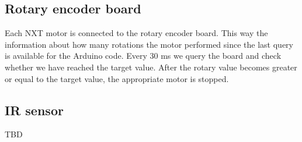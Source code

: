 \documentclass[12pt]{article}
\begin{document}
\subsection{Rotary encoder board}

Each NXT motor is connected to the rotary encoder board. This way the
information about how many rotations the motor performed since the last query
is available for the Arduino code. Every 30 ms we query the board and
check whether we have reached the target value. After the rotary value becomes
greater or equal to the target value, the appropriate motor is stopped.

\subsection{IR sensor}

TBD
\end{document}
